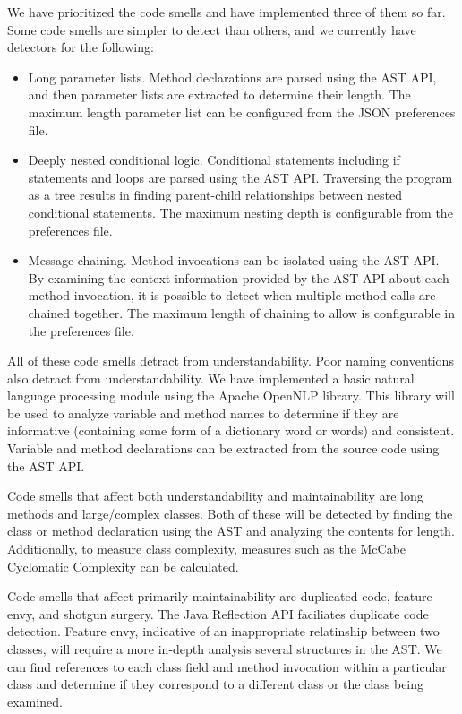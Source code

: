 \documentclass{sig-alternate}
\begin{document}
We have prioritized the code smells and have implemented three of them so far.
Some code smells are simpler to detect than others, and we currently have
detectors for the following:

\begin{itemize}
	\item Long parameter lists. Method declarations are parsed using the AST
		API, and then parameter lists are extracted to determine their length.
		The maximum length parameter list can be configured from the JSON
		preferences file.
	\item Deeply nested conditional logic. Conditional statements including if
		statements and loops are parsed using the AST API. Traversing the
		program as a tree results in finding parent-child relationships between
		nested conditional statements. The maximum nesting depth is configurable
		from the preferences file. 
	\item Message chaining. Method invocations can be isolated using the AST
		API. By examining the context information provided by the AST API about
		each method invocation, it is possible to detect when multiple method
		calls are chained together. The maximum length of chaining to allow is
		configurable in the preferences file.
\end{itemize}

All of these code smells detract from understandability. Poor naming conventions
also detract from understandability. We have implemented a basic natural
language processing module using the Apache OpenNLP library. This library will
be used to analyze variable and method names to determine if they are
informative (containing some form of a dictionary word or words) and consistent.
Variable and method declarations can be extracted from the source code using the
AST API. 

Code smells that affect both understandability and maintainability are long methods
and large/complex classes. Both of these will be detected by finding the class
or method declaration using the AST and analyzing the contents for length.
Additionally, to measure class complexity, measures such as the McCabe
Cyclomatic Complexity \cite{mccabe1976complexity} can be calculated. 

Code smells that affect primarily maintainability are duplicated code,
feature envy, and shotgun surgery. The Java Reflection API
\cite{oracle2013reflection}
faciliates duplicate code detection. Feature envy, indicative of an
inappropriate relatinship between two classes, will require a more in-depth
analysis several structures in the AST. We can find references to each class
field and method invocation within a particular class and determine if they
correspond to a different class or the class being examined. 
\end{document}
